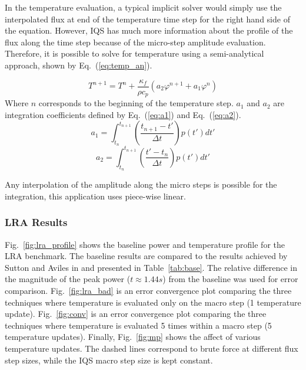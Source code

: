 \documentclass{anstrans}
\newcommand{\eqt}[1]{Eq.~(\ref{#1})}                     %
\newcommand{\fig}[1]{Fig.~\ref{#1}}                      %
\newcommand{\tbl}[1]{Table~\ref{#1}}                     %
\newcommand{\be}{\begin{equation}}
\newcommand{\ee}{\end{equation}}
\begin{document}
In the temperature evaluation, a typical implicit solver would simply use the interpolated flux at end of the temperature time step for the right hand side of the equation.  However, IQS has much more information about the profile of the flux along the time step because of the micro-step amplitude evaluation.  Therefore, it is possible to solve for temperature using a semi-analytical approach, shown by \eqt{eq:temp_an}.

\be
T^{n+1} = T^n + \frac{\kappa_f}{\rho c_p} \left(a_2 \varphi^{n+1} + a_1 \varphi^{n}\right)
\label{eq:temp_an}
\ee
Where $n$ corresponds to the beginning of the temperature step.  $a_1$ and $a_2$ are integration coefficients defined by \eqt{eq:a1} and \eqt{eq:a2}.
\be
a_1 = \int_{t_n}^{t_{n+1}}\left(\frac{t_{n+1}-t'}{\Delta t}\right)p(t')dt'
\label{eq:a1}
\ee
\be
a_2 = \int_{t_n}^{t_{n+1}}\left(\frac{t'-t_n}{\Delta t}\right)p(t')dt'
\label{eq:a2}
\ee

Any interpolation of the amplitude along the micro steps is possible for the integration, this application uses piece-wise linear.

\subsubsection{LRA Results}

\fig{fig:lra_profile} shows the baseline power and temperature profile for the LRA benchmark.  The baseline results are compared to the results achieved by Sutton and Aviles in \cite{Sutton_1996} and presented in \tbl{tab:base}.  The relative difference in the magnitude of the peak power ($t\approx1.44 s$) from the baseline was used for error comparison.  \fig{fig:lra_bad} is an error convergence plot comparing the three techniques where temperature is evaluated only on the macro step (1 temperature update).  \fig{fig:conv} is an error convergence plot comparing the three techniques where temperature is evaluated 5 times within a macro step (5 temperature updates).  Finally, \fig{fig:mp} shows the affect of various temperature updates. The dashed lines correspond to brute force at different flux step sizes, while the IQS macro step size is kept constant. \\
\end{document}
